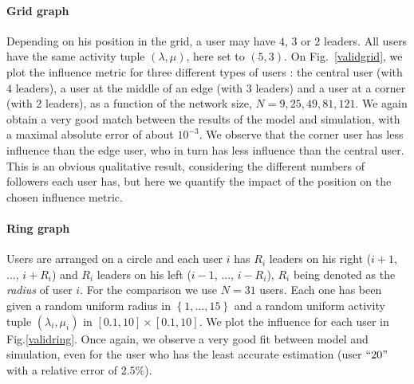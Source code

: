 \documentclass[10pt, conference, letterpaper]{IEEEtran}
\begin{document}
{\paragraph{Grid graph} Depending on his position in the grid, a user may have $4$, $3$ or $2$ leaders. All users have the same activity tuple $(\lambda,\mu)$, here set to $(5,3)$. On Fig.~\ref{validgrid}, we plot the influence metric for three different types of users : the central user (with $4$ leaders), a user at the middle of an edge (with $3$ leaders) and a user at a corner (with $2$ leaders), as a function of the network size, $N=9, 25, 49, 81, 121$. We again obtain a very good match between the results of the model and simulation, with a maximal absolute error of about $10^{-3}$.
We observe that the corner user has less influence than the edge user, who in turn has less influence than the central user. This is an obvious qualitative result, considering the different numbers of followers each user has, but here we quantify the impact of the position on the chosen influence metric.
	
\paragraph{Ring graph} Users are arranged on a circle and each user $i$ has $R_i$ leaders on his right ($i+1$, ..., $i+R_i$) and $R_i$ leaders on his left ($i-1$, ..., $i-R_i$), $R_i$ being denoted as the \textit{radius} of user $i$.
For the comparison we use $N=31$ users. Each one has been given a random uniform radius in $\left\{1,...,15\right\}$ and a random uniform activity tuple $(\lambda_i,\mu_i)$ in $\left[0.1,10\right] \times \left[0.1,10\right]$. We plot the influence for each user in Fig.\ref{validring}.
Once again, we observe a very good fit between model and simulation, even for the user who has the least accurate estimation (user $``20"$ with a relative error of $2.5\%$).
	
}
\end{document}
